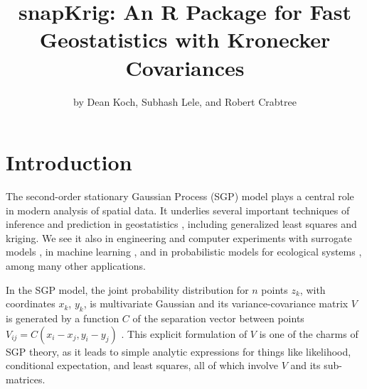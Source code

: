 \title{snapKrig: An R Package for Fast Geostatistics with Kronecker Covariances}
\author{by Dean Koch, Subhash Lele, and Robert Crabtree}

\maketitle


\hypertarget{introduction}{%
\section{Introduction}\label{introduction}}

The second-order stationary Gaussian Process (SGP) model plays a central role in modern analysis of spatial data. It underlies several important techniques of inference and prediction in geostatistics \citep{chiles2012geostatistics}, including generalized least squares and kriging. We see it also in engineering and computer experiments with surrogate models \citep{gramacy2016lagp}, in machine learning \citep{rasmussen2006gaussian}, and in probabilistic models for ecological systems \citep{koch2021signature}, among many other applications.

In the SGP model, the joint probability distribution for \(n\) points \(z_k\), with coordinates \(x_k\), \(y_k\), is multivariate Gaussian and its variance-covariance matrix \(V\) is generated by a function \(C\) of the separation vector between points \(V_{ij} = C ( x_i - x_j, y_i - y_j )\) \citep{cressie2015statistics}. This explicit formulation of \(V\) is one of the charms of SGP theory, as it leads to simple analytic expressions for things like likelihood, conditional expectation, and least squares, all of which involve \(V\) and its sub-matrices.

